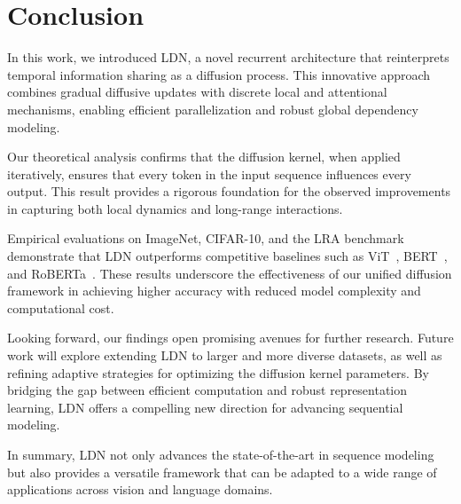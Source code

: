 \section{Conclusion}
In this work, we introduced LDN, a novel recurrent architecture that reinterprets temporal information sharing as a diffusion process. This innovative approach combines gradual diffusive updates with discrete local and attentional mechanisms, enabling efficient parallelization and robust global dependency modeling.

Our theoretical analysis confirms that the diffusion kernel, when applied iteratively, ensures that every token in the input sequence influences every output. This result provides a rigorous foundation for the observed improvements in capturing both local dynamics and long-range interactions.

Empirical evaluations on ImageNet, CIFAR-10, and the LRA benchmark demonstrate that LDN outperforms competitive baselines such as ViT~\cite{dosovitskiy2020image}, BERT~\cite{devlin2019bert}, and RoBERTa~\cite{liu2019roberta}. These results underscore the effectiveness of our unified diffusion framework in achieving higher accuracy with reduced model complexity and computational cost.

Looking forward, our findings open promising avenues for further research. Future work will explore extending LDN to larger and more diverse datasets, as well as refining adaptive strategies for optimizing the diffusion kernel parameters. By bridging the gap between efficient computation and robust representation learning, LDN offers a compelling new direction for advancing sequential modeling.

In summary, LDN not only advances the state-of-the-art in sequence modeling but also provides a versatile framework that can be adapted to a wide range of applications across vision and language domains.
